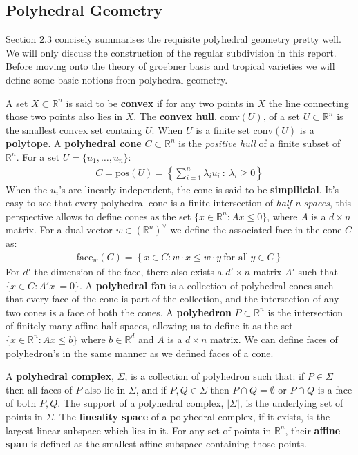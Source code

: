     \subsection{Polyhedral Geometry}
    Section $2.3$ \cite{maclagan2015introduction} concisely summarises the requisite polyhedral geometry pretty well. We will only discuss the construction of the regular subdivision in this report.
   Before moving onto the theory of groebner basis and tropical varieties we will define some basic notions from polyhedral geometry.
   \par A set $X\subset \mathbb{R}^{n}$ is said to be \textbf{convex} if for any two points in $X$ the line connecting those two points also lies in $X$. 
   The \textbf{convex hull}, conv$(U)$, of a set $U\subset \mathbb{R}^{n}$ is the smallest convex set containg $U$.
   When $U$ is a finite set $\text{conv}(U)$ is a \textbf{polytope}. 
   A \textbf{polyhedral cone} $C \subset \mathbb{R}^{n}$ is the \textit{positive hull} of a finite subset of $\mathbb{R}^{n}$. 
   For a set $U = \{u_1,\dots,u_n\}$:
   \begin{align*}
       C = \text{pos}(U) = \left\{\sum_{i=1}^{n}\lambda_i u_i~:~\lambda_i\geq 0\right\}
   \end{align*}
   When the $u_i$'s are linearly independent, the cone is said to be \textbf{simpilicial}. 
    It's easy to see that every polyhedral cone is a finite intersection of \textit{half n-spaces}, this perspective allows to define cones as the set $\{x \in \mathbb{R}^{n}: Ax\leq 0\}$, where $A$ is a $d \times n$ matrix. 
    For a dual vector $w \in (\mathbb{R}^{n})^{\vee}$ we define the associated face in the cone $C$ as:
    \begin{align*}
        \text{face}_{w}(C) = \left\{x \in C: w\cdot x \leq w\cdot y ~\text{for all}~y \in C\right\}
    \end{align*}
    For $d'$ the dimension of the face, there also exists a $d'\times n$ matrix $A'$ such that $\{x \in C: A'x\ =  0\}$. 
    A \textbf{polyhedral fan} is a collection of polyhedral cones such that every face of the cone is part of the collection, and the intersection of any two cones is a face of both the cones.
    A \textbf{polyhedron} $P \subset \mathbb{R}^{n}$ is the intersection of finitely many affine half spaces, allowing us to define it as the set $\{x \in \mathbb{R}^{n}: Ax\leq b\}$ where $b \in \mathbb{R}^{d}$ and $A$ is a $d \times n$ matrix. We can define faces of polyhedron's in the same manner as we defined faces of a cone.
    \par A \textbf{polyhedral complex}, $\Sigma$, is a collection of polyhedron such that: if $P \in \Sigma$ then all faces of $P$ also lie in $\Sigma$, and if $P,Q \in \Sigma$ then $P \cap Q = \emptyset$ or $P \cap Q$ is a face of both $P,Q$. 
    The support of a polyhedral complex, $|\Sigma |$, is the underlying set of points in $\Sigma$. 
    The \textbf{lineality space} of a polyhedral complex, if it exists, is the largest linear subspace which lies in it.
    For any set of points in $\mathbb{R}^{n}$, their \textbf{affine span} is defined as the smallest affine subspace containing those points.

